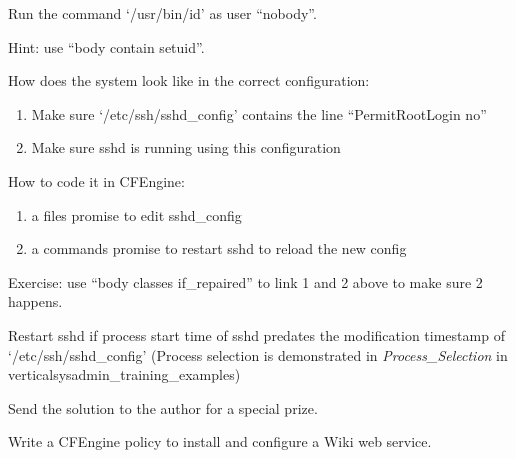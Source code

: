 \begin{aside}
\label{aside:exercise_47}

Run the command `/usr/bin/id' as user ``nobody''.

Hint: use ``body contain setuid''.

\end{aside}





\begin{aside}
\label{aside:exercise_48}

How does the system look like in the correct configuration:

\begin{enumerate}
\item{} Make sure `/etc/ssh/sshd\_config' contains the line ``PermitRootLogin no''
\item{} Make sure sshd is running using this configuration
\end{enumerate}

How to code it in CFEngine:

\begin{enumerate}
\item{} a files promise to edit sshd\_config
\item{} a commands promise to restart sshd to reload the new config
\end{enumerate}

Exercise:  use ``body classes if\_repaired'' to link 1 and 2 above to make sure 2 happens.

\end{aside}





\begin{aside}
\label{aside:exercise_49}

Restart sshd if process start time of sshd predates the modification timestamp of `/etc/ssh/sshd\_config' (Process selection is demonstrated in \emph{Process\_Selection} in verticalsysadmin\_training\_examples)

Send the solution to the author for a special prize.

\end{aside}





\begin{aside}
\label{aside:exercise_50}

Write a CFEngine policy to install and configure a Wiki web service.

\end{aside}





